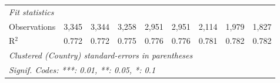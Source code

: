 \begin{tabular}{lcccccccc}
   \midrule \emph{Fit statistics}\\
   Observations                                              & 3,345         & 3,344         & 3,258         & 2,951        & 2,951        & 2,114        & 1,979         & 1,827\\  
   R$^2$                                                     & 0.772         & 0.772         & 0.775         & 0.776        & 0.776        & 0.781        & 0.782         & 0.782\\  
   \midrule
   \multicolumn{9}{l}{\emph{Clustered (Country) standard-errors in parentheses}}\\
   \multicolumn{9}{l}{\emph{Signif. Codes: ***: 0.01, **: 0.05, *: 0.1}}\\
\end{tabular}
\par\endgroup


